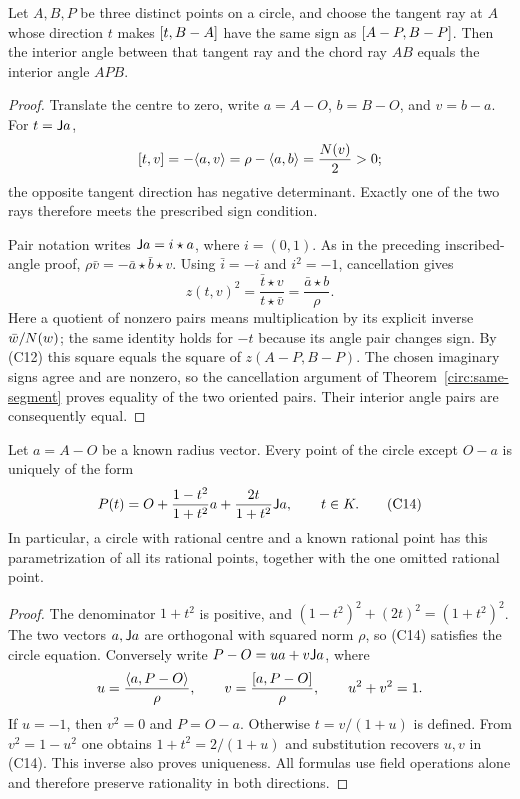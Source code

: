 \begin{theorem}
\label{circ:tangent-chord}
Let $A,B,P$ be three distinct points on a circle, and choose the tangent
ray at $A$ whose direction $t$ makes
$[t,B-A]$ have the same sign as
$[A-P,B-P]$.  Then the interior angle between that tangent ray and
the chord ray $AB$ equals the interior angle $APB$.
\end{theorem}
\begin{proof}
Translate the centre to zero, write $a=A-O$, $b=B-O$, and $v=b-a$.
For $t=\mathsf J a$,
\[
 [t,v]=-\langle a,v\rangle=\rho-\langle a,b\rangle=\frac{N(v)}{2}>0;
\]
the opposite tangent direction has negative determinant.  Exactly one of
the two rays therefore meets the prescribed sign condition.

Pair notation writes $\mathsf J a=i\star a$, where $i=(0,1)$.
As in the preceding inscribed-angle proof,
$\rho\bar v=-\bar a\star\bar b\star v$.
Using $\bar i=-i$ and $i^2=-1$, cancellation gives
\[
 z(t,v)^2=\frac{\bar t\star v}{t\star\bar v}
          =\frac{\bar a\star b}{\rho}.
\]
Here a quotient of nonzero pairs means multiplication by its explicit
inverse $\bar w/N(w)$; the same identity holds for $-t$ because its
angle pair changes sign.  By (C12) this square equals the square of
$z(A-P,B-P)$.  The chosen imaginary signs agree and are nonzero, so the
cancellation argument of Theorem~\ref{circ:same-segment} proves equality
of the two oriented pairs.  Their interior angle pairs are consequently
equal.
\end{proof}

\begin{theorem}
\label{circ:parameter}
Let $a=A-O$ be a known radius vector.  Every point of the circle except
$O-a$ is uniquely of the form
\[
 P(t)=O+\frac{1-t^2}{1+t^2}a+\frac{2t}{1+t^2}\mathsf J a,
       \qquad t\in K.                              \tag{C14}
\]
In particular, a circle with rational centre and a known rational point
has this parametrization of all its rational points, together with the
one omitted rational point.
\end{theorem}
\begin{proof}
The denominator $1+t^2$ is positive, and
$(1-t^2)^2+(2t)^2=(1+t^2)^2$.  The two vectors $a,\mathsf J a$ are orthogonal
with squared norm $\rho$, so (C14) satisfies the circle equation.
Conversely write $P-O=ua+v\mathsf J a$, where
\[
 u=\frac{\langle a,P-O\rangle}{\rho},\qquad
 v=\frac{[a,P-O]}{\rho},\qquad u^2+v^2=1.
\]
If $u=-1$, then $v^2=0$ and $P=O-a$.
Otherwise $t=v/(1+u)$ is defined.  From $v^2=1-u^2$ one obtains
$1+t^2=2/(1+u)$ and substitution recovers $u,v$ in (C14).
This inverse also proves uniqueness.  All formulas use field operations
alone and therefore preserve rationality in both directions.
\end{proof}

